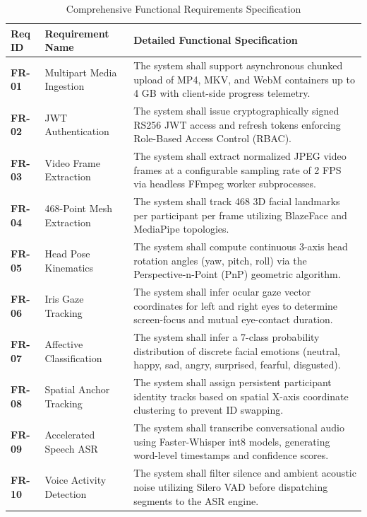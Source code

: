 \documentclass[12pt,a4paper,oneside]{report}
\begin{document}
\begin{table}[htbp]
\centering
\caption{Comprehensive Functional Requirements Specification}
\label{tab:functional_reqs}
\fontsize{8.5}{10.5}\selectfont
\begin{tabularx}{\textwidth}{@{}l p{3.2cm} X@{}}
\toprule
\textbf{Req ID} & \textbf{Requirement Name} & \textbf{Detailed Functional Specification} \\
\midrule
\textbf{FR-01} & Multipart Media Ingestion & The system shall support asynchronous chunked upload of MP4, MKV, and WebM containers up to 4 GB with client-side progress telemetry. \\
\textbf{FR-02} & JWT Authentication & The system shall issue cryptographically signed RS256 JWT access and refresh tokens enforcing Role-Based Access Control (RBAC). \\
\textbf{FR-03} & Video Frame Extraction & The system shall extract normalized JPEG video frames at a configurable sampling rate of 2 FPS via headless FFmpeg worker subprocesses. \\
\textbf{FR-04} & 468-Point Mesh Extraction & The system shall track 468 3D facial landmarks per participant per frame utilizing BlazeFace and MediaPipe topologies. \\
\textbf{FR-05} & Head Pose Kinematics & The system shall compute continuous 3-axis head rotation angles (yaw, pitch, roll) via the Perspective-n-Point (PnP) geometric algorithm. \\
\textbf{FR-06} & Iris Gaze Tracking & The system shall infer ocular gaze vector coordinates for left and right eyes to determine screen-focus and mutual eye-contact duration. \\
\textbf{FR-07} & Affective Classification & The system shall infer a 7-class probability distribution of discrete facial emotions (neutral, happy, sad, angry, surprised, fearful, disgusted). \\
\textbf{FR-08} & Spatial Anchor Tracking & The system shall assign persistent participant identity tracks based on spatial X-axis coordinate clustering to prevent ID swapping. \\
\textbf{FR-09} & Accelerated Speech ASR & The system shall transcribe conversational audio using Faster-Whisper int8 models, generating word-level timestamps and confidence scores. \\
\textbf{FR-10} & Voice Activity Detection & The system shall filter silence and ambient acoustic noise utilizing Silero VAD before dispatching segments to the ASR engine. \\

\end{tabularx}
\end{table}
\end{document}
